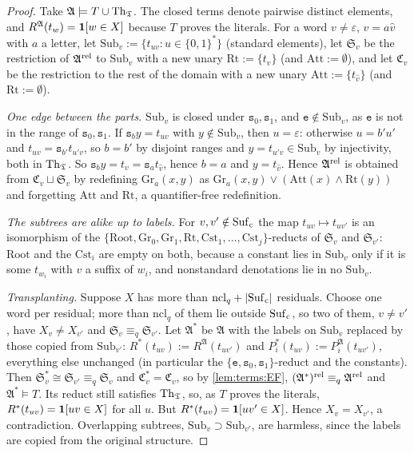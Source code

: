 \begin{proof}
Take $\mathfrak A\models T\cup\mathrm{Th}_{\mathfrak{T}}$. The closed terms denote pairwise distinct elements, and $R^{\mathfrak A}(t_w)=\mathbf{1}[w\in X]$ because $T$ proves the literals. For a word $v\ne\varepsilon$, $v=a\hat v$ with $a$ a letter, let $\mathrm{Sub}_v:=\{t_{uv}:u\in\{0,1\}^*\}$ (standard elements), let $\mathfrak S_v$ be the restriction of $\mathfrak A^{\rm rel}$ to $\mathrm{Sub}_v$ with a new unary $\mathrm{Rt}:=\{t_v\}$ (and $\mathrm{Att}:=\emptyset$), and let $\mathfrak C_v$ be the restriction to the rest of the domain with a new unary $\mathrm{Att}:=\{t_{\hat v}\}$ (and $\mathrm{Rt}:=\emptyset$).

\emph{One edge between the parts.} $\mathrm{Sub}_v$ is closed under $\mathtt s_0,\mathtt s_1$, and $\mathtt e\notin\mathrm{Sub}_v$, as $\mathtt e$ is not in the range of $\mathtt s_0,\mathtt s_1$. If $\mathtt s_by=t_{uv}$ with $y\notin\mathrm{Sub}_v$, then $u=\varepsilon$: otherwise $u=b'u'$ and $t_{uv}=\mathtt s_{b'}t_{u'v}$, so $b=b'$ by disjoint ranges and $y=t_{u'v}\in\mathrm{Sub}_v$ by injectivity, both in $\mathrm{Th}_{\mathfrak{T}}$. So $\mathtt s_by=t_v=\mathtt s_at_{\hat v}$, hence $b=a$ and $y=t_{\hat v}$. Hence $\mathfrak A^{\rm rel}$ is obtained from $\mathfrak C_v\sqcup\mathfrak S_v$ by redefining $\mathrm{Gr}_a(x,y)$ as $\mathrm{Gr}_a(x,y)\vee(\mathrm{Att}(x)\wedge\mathrm{Rt}(y))$ and forgetting $\mathrm{Att}$ and $\mathrm{Rt}$, a quantifier-free redefinition.

\emph{The subtrees are alike up to labels.} For $v,v'\notin\mathrm{Suf}_{\rm c}$ the map $t_{uv}\mapsto t_{uv'}$ is an isomorphism of the $\{\mathrm{Root},\mathrm{Gr}_0,\mathrm{Gr}_1,\mathrm{Rt},\mathrm{Cst}_1,\dots,\mathrm{Cst}_j\}$-reducts of $\mathfrak S_v$ and $\mathfrak S_{v'}$: $\mathrm{Root}$ and the $\mathrm{Cst}_i$ are empty on both, because a constant lies in $\mathrm{Sub}_v$ only if it is some $t_{w_i}$ with $v$ a suffix of $w_i$, and nonstandard denotations lie in no $\mathrm{Sub}_v$.

\emph{Transplanting.} Suppose $X$ has more than $\mathrm{ncl}_q+\lvert\mathrm{Suf}_{\rm c}\rvert$ residuals. Choose one word per residual; more than $\mathrm{ncl}_q$ of them lie outside $\mathrm{Suf}_{\rm c}$, so two of them, $v\ne v'$, have $X_v\ne X_{v'}$ and $\mathfrak S_v\equiv_q\mathfrak S_{v'}$. Let $\mathfrak A^*$ be $\mathfrak A$ with the labels on $\mathrm{Sub}_v$ replaced by those copied from $\mathrm{Sub}_{v'}$: $R^*(t_{uv}):=R^{\mathfrak A}(t_{uv'})$ and $P_i^*(t_{uv}):=P_i^{\mathfrak A}(t_{uv'})$, everything else unchanged (in particular the $\{\mathtt e,\mathtt s_0,\mathtt s_1\}$-reduct and the constants). Then $\mathfrak S^*_v\cong\mathfrak S_{v'}\equiv_q\mathfrak S_v$ and $\mathfrak C^*_v=\mathfrak C_v$, so by \cref{lem:terms:EF}, $(\mathfrak A^*)^{\rm rel}\equiv_q\mathfrak A^{\rm rel}$ and $\mathfrak A^*\models T$. Its reduct still satisfies $\mathrm{Th}_{\mathfrak{T}}$, so, as $T$ proves the literals, $R^*(t_{uv})=\mathbf{1}[uv\in X]$ for all $u$. But $R^*(t_{uv})=\mathbf{1}[uv'\in X]$. Hence $X_v=X_{v'}$, a contradiction. Overlapping subtrees, $\mathrm{Sub}_v\supset\mathrm{Sub}_{v'}$, are harmless, since the labels are copied from the original structure.
\end{proof}


